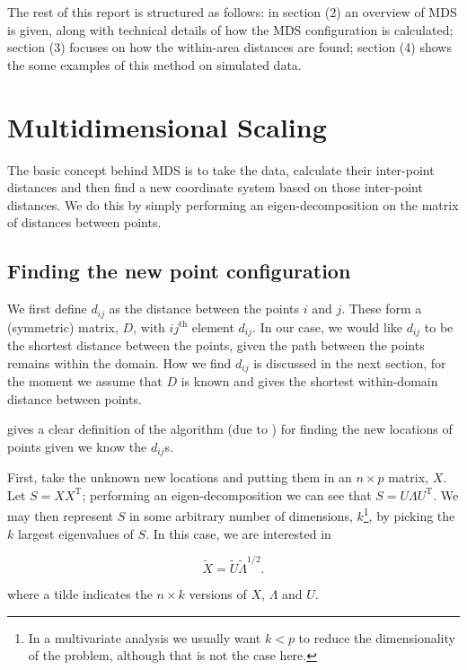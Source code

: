 \documentclass[a4paper,10pt]{amsart}
\newcommand{\tr}[1]{#1^{\text{T}}}
\begin{document}
The rest of this report is structured as follows: in section (2) an overview of MDS is given, along with technical details of how the MDS configuration is calculated; section (3) focuses on how the within-area distances are found; section (4) shows the some examples of this method on simulated data.

\section{Multidimensional Scaling}

The basic concept behind MDS is to take the data, calculate their inter-point distances and then find a new coordinate system based on those inter-point distances. We do this by simply performing an eigen-decomposition on the matrix of distances between points.

\subsection{Finding the new point configuration}

We first define $d_{ij}$ as the distance between the points $i$ and $j$. These form a (symmetric) matrix, $D$, with $ij^{\text{th}}$ element $d_{ij}$. In our case, we would like $d_{ij}$ to be the shortest distance between the points, given the path between the points remains within the domain. How we find $d_{ij}$ is discussed in the next section, for the moment we assume that $D$ is known and gives the shortest within-domain distance between points.

\cite{diaconis08} gives a clear definition of the algorithm (due to \cite{schoenberg35}) for finding the new locations of points given we know the $d_{ij}$s. 

First, take the unknown new locations and putting them in an $n \times p$ matrix, $X$. Let $S=X\tr{X}$; performing an eigen-decomposition we can see that $S=U\Lambda\tr{U}$. We may then represent $S$ in some arbitrary number of dimensions, $k$\footnote{In a multivariate analysis we usually want $k<p$ to reduce the dimensionality of the problem, although that is not the case here.}, by picking the $k$ largest eigenvalues of $S$. In this case, we are interested in

\begin{equation}
\tilde{X}=\tilde{U}\tilde{\Lambda}^{1/2}.
\end{equation}

where a tilde indicates the $n \times k$ versions of $X$, $\Lambda$ and $U$.
\end{document}
